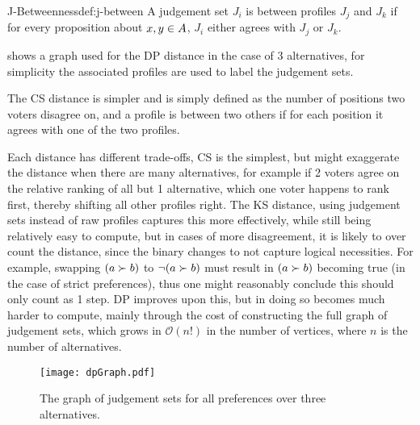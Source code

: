 \begin{definition}{J-Betweenness}{def:j-between}
	A judgement set $J_i$ is between profiles $J_j$ and $J_k$ if for every proposition about $x,y \in A$, $J_i$ either agrees with $J_j$ or $J_k$.
\end{definition}

 shows a graph used for the DP distance in the case of 3 alternatives, for simplicity the associated profiles are used to label the judgement sets.


The CS distance is simpler and is simply defined as the number of positions two voters disagree on, and a profile is between two others if for each position it agrees with one of the two profiles.

Each distance has different trade-offs, CS is the simplest, but might exaggerate the distance when there are many alternatives, for example if 2 voters agree on the relative ranking of all but 1 alternative, which one voter happens to rank first, thereby shifting all other profiles right. The KS distance, using judgement sets instead of raw profiles captures this more effectively, while still being relatively easy to compute, but in cases of more disagreement, it is likely to over count the distance, since the binary changes to not capture logical necessities. For example, swapping $( a \succ b)$ to $\neg (a \succ b)$ must result in $(a \succ b)$ becoming true (in the case of strict preferences), thus one might reasonably conclude this should only count as 1 step. DP improves upon this, but in doing so becomes much harder to compute, mainly through the cost of constructing the full graph of judgement sets, which grows in $\mathcal{O}(n!)$ in the number of vertices, where $n$ is the number of alternatives.


\vspace{1em}
\begin{figure}
	\centering
	\texttt{[image: dpGraph.pdf]}
	\caption{The graph of judgement sets for all preferences over three alternatives.}
	\label{figure:DPDistance}
\end{figure}

